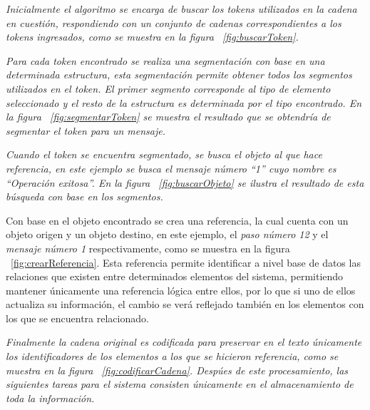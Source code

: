 	\begin{enumerate}
		\item {\it Inicialmente el algoritmo se encarga de buscar los tokens utilizados en la cadena en cuestión, respondiendo con un conjunto de cadenas correspondientes a los tokens ingresados, como se muestra en la figura ~\ref{fig:buscarToken}.}
		
		\newpage
		
		\item {\it Para cada token encontrado se realiza una segmentación con base en una determinada estructura, esta segmentación permite obtener todos los segmentos utilizados en el token. El primer segmento corresponde al tipo de elemento seleccionado y el resto de la estructura es determinada por el tipo encontrado. En la figura ~\ref{fig:segmentarToken} se muestra el resultado que se obtendría de segmentar el token para un mensaje.}
		
		
		\item {\it Cuando el token se encuentra segmentado, se busca el objeto al que hace referencia, en este ejemplo se busca el mensaje número ``1'' cuyo nombre es ``Operación exitosa''. En la figura ~\ref{fig:buscarObjeto} se ilustra el resultado de esta búsqueda con base en los segmentos. 
		
		
		\item Con base en el objeto encontrado se crea una referencia, la cual cuenta con un objeto origen y un objeto destino, en este ejemplo, el {\it paso número 12} y el {\it mensaje número 1} respectivamente, como se muestra en la figura ~\ref{fig:crearReferencia}. Esta referencia permite identificar a nivel base de datos las relaciones que existen entre determinados elementos del sistema, permitiendo mantener únicamente una referencia lógica entre ellos, por lo que si uno de ellos actualiza su información, el cambio se verá reflejado también en los elementos con los que se encuentra relacionado.}
		
\newpage
		\item {\it Finalmente la cadena original es codificada para preservar en el texto únicamente los identificadores de los elementos a los que se hicieron referencia, como se muestra en la figura ~\ref{fig:codificarCadena}. Despúes de este procesamiento, las siguientes tareas para el sistema consisten únicamente en el almacenamiento de toda la información.}
				
		
			
	\end{enumerate}
	
